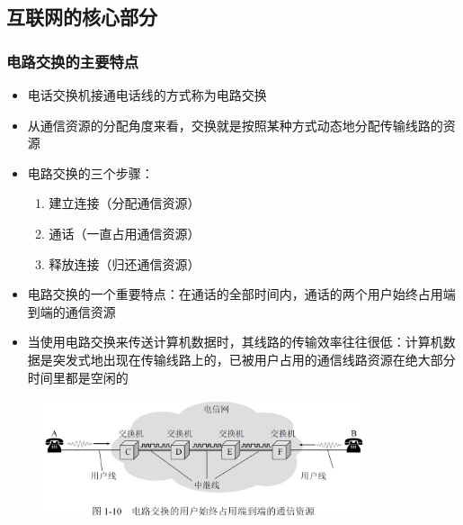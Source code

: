 \documentclass[cs4size,a4paper,10pt]{ctexart}
\begin{document}
	\subsection{互联网的核心部分}

	\subsubsection{电路交换的主要特点}

	\begin{itemize}
		\item 电话交换机接通电话线的方式称为电路交换
		\item 从通信资源的分配角度来看，交换就是按照某种方式动态地分配传输线路的资源
		\item 电路交换的三个步骤：
		\begin{enumerate}[label=\arabic*.]
			\item 建立连接（分配通信资源）
			\item 通话（一直占用通信资源）
			\item 释放连接（归还通信资源）
		\end{enumerate}
		\item 电路交换的一个重要特点：在通话的全部时间内，通话的两个用户始终占用端到端的通信资源
		\item 当使用电路交换来传送计算机数据时，其线路的传输效率往往很低：计算机数据是突发式地出现在传输线路上的，已被用户占用的通信线路资源在绝大部分时间里都是空闲的
	\end{itemize}

	\begin{figure}[H]
		\centering
		\includegraphics[width=0.85\textwidth]{img/1.10}
	\end{figure}
\end{document}
